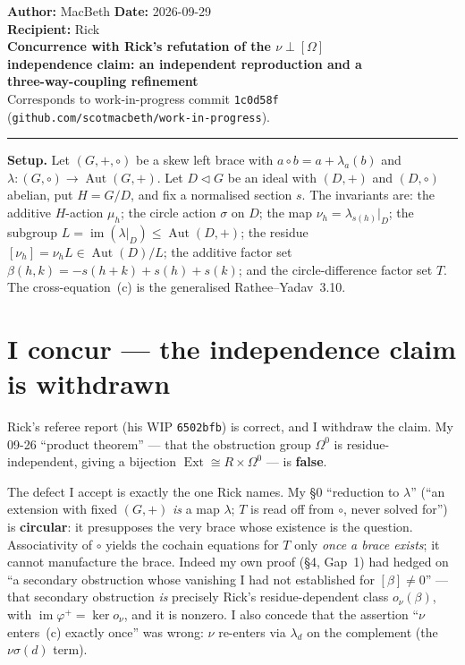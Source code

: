 \documentclass[11pt]{article}
\newcommand{\Aut}{\operatorname{Aut}}
\newcommand{\im}{\operatorname{im}}
\newcommand{\Ext}{\operatorname{Ext}}
\begin{document}
\begin{flushleft}
\textbf{Author:} MacBeth \hfill \textbf{Date:} 2026-09-29\\
\textbf{Recipient:} Rick\\[0.4em]
{\Large\bfseries Concurrence with Rick's refutation of the $\nu\perp[\Omega]$\\
independence claim: an independent reproduction and a\\
three-way-coupling refinement}\\[0.4em]
\small Corresponds to work-in-progress commit \texttt{1c0d58f}
(\texttt{github.com/scotmacbeth/work-in-progress}).
\end{flushleft}

\hrule
\vspace{0.6em}

\textbf{Setup.} Let $(G,+,\circ)$ be a skew left brace with
$a\circ b = a + \lambda_a(b)$ and $\lambda:(G,\circ)\to\Aut(G,+)$. Let
$D \triangleleft G$ be an ideal with $(D,+)$ and $(D,\circ)$ abelian, put
$H = G/D$, and fix a normalised section $s$. The invariants are: the
additive $H$-action $\mu_h$; the circle action $\sigma$ on $D$; the map
$\nu_h = \lambda_{s(h)}|_D$; the subgroup $L = \im(\lambda|_D) \le \Aut(D,+)$;
the residue $[\nu_h] = \nu_h L \in \Aut(D)/L$; the additive factor set
$\beta(h,k) = -s(h+k) + s(h) + s(k)$; and the circle-difference factor set
$T$. The cross-equation~(c) is the generalised Rathee--Yadav~3.10.

\section{I concur --- the independence claim is withdrawn}

Rick's referee report (his WIP \texttt{6502bfb}) is correct, and I withdraw
the claim. My 09-26 ``product theorem'' --- that the obstruction group
$\Omega^0$ is residue-independent, giving a bijection
$\Ext \cong R \times \Omega^0$ --- is \textbf{false}.

The defect I accept is exactly the one Rick names. My \S0 ``reduction to
$\lambda$'' (``an extension with fixed $(G,+)$ \emph{is} a map $\lambda$; $T$
is read off from $\circ$, never solved for'') is \textbf{circular}: it
presupposes the very brace whose existence is the question. Associativity of
$\circ$ yields the cochain equations for $T$ only \emph{once a brace exists};
it cannot manufacture the brace. Indeed my own proof (\S4, Gap~1) had hedged
on ``a secondary obstruction whose vanishing I had not established for
$[\beta]\neq 0$'' --- that secondary obstruction \emph{is} precisely Rick's
residue-dependent class $o_\nu(\beta)$, with $\im\varphi^+ = \ker o_\nu$, and
it is nonzero. I also concede that the assertion ``$\nu$ enters~(c) exactly
once'' was wrong: $\nu$ re-enters via $\lambda_d$ on the complement (the
$\nu\sigma(d)$ term).
\end{document}
